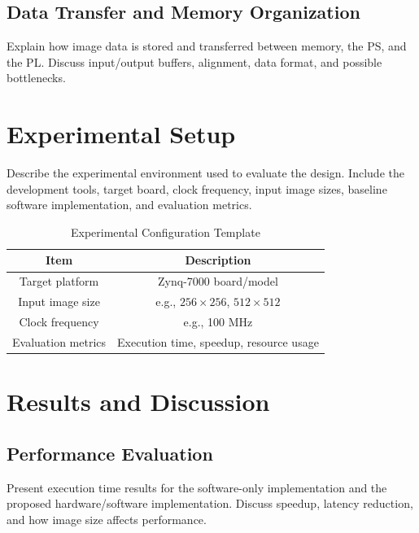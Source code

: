 \documentclass[conference]{IEEEtran}
\begin{document}
\subsection{Data Transfer and Memory Organization}
Explain how image data is stored and transferred between memory, the PS, and the PL. Discuss input/output buffers, alignment, data format, and possible bottlenecks.

\section{Experimental Setup}\label{sec:experimental-setup}
Describe the experimental environment used to evaluate the design. Include the development tools, target board, clock frequency, input image sizes, baseline software implementation, and evaluation metrics.

\begin{table}[htbp]
    \caption{Experimental Configuration Template}
    \begin{center}
        \begin{tabular}{|c|c|}
            \hline
            \textbf{Item}      & \textbf{Description}                    \\
            \hline
            Target platform    & Zynq-7000 board/model                   \\
            \hline
            Input image size   & e.g., $256\times256$, $512\times512$    \\
            \hline
            Clock frequency    & e.g., 100 MHz                           \\
            \hline
            Evaluation metrics & Execution time, speedup, resource usage \\
            \hline
        \end{tabular}
        \label{tab:experimental-config}
    \end{center}
\end{table}

\section{Results and Discussion}\label{sec:results}
\subsection{Performance Evaluation}
Present execution time results for the software-only implementation and the proposed hardware/software implementation. Discuss speedup, latency reduction, and how image size affects performance.
\end{document}
